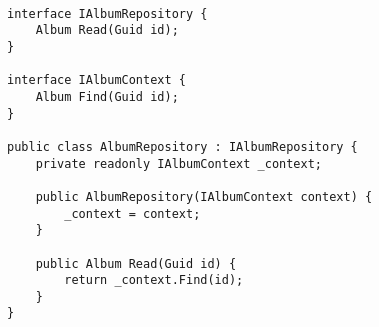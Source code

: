 
\begin{lstlisting}
    
interface IAlbumRepository {
    Album Read(Guid id);
}

interface IAlbumContext {
    Album Find(Guid id);
}

public class AlbumRepository : IAlbumRepository {
    private readonly IAlbumContext _context;

    public AlbumRepository(IAlbumContext context) {
        _context = context;
    }

    public Album Read(Guid id) {
        return _context.Find(id);
    }
}

\end{lstlisting}
